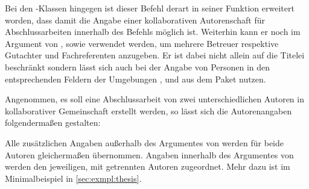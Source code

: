 \begin{DeclareEntity*}{}
\begin{DeclareEntity*}{}
\begin{DeclareEntity*}{}
\begin{Declaration}
Bei den \TUDScript-Klassen hingegen ist dieser Befehl derart in seiner Funktion 
erweitert worden, dass damit die Angabe einer kollaborativen Autorenschaft für 
Abschlussarbeiten innerhalb des Befehls  möglich ist. Weiterhin 
kann er noch im Argument von ,  sowie 
 verwendet werden, um mehrere Betreuer respektive Gutachter und 
Fachreferenten anzugeben. Er ist dabei nicht allein auf die Titelei beschränkt 
sondern lässt sich auch bei der Angabe von Personen in den entsprechenden 
Feldern der Umgebungen ,  und 
 aus dem Paket  nutzen.
\end{Declaration}
%
\begin{Example}
Angenommen, es soll eine Abschlussarbeit von zwei unterschiedlichen Autoren in 
kollaborativer Gemeinschaft erstellt werden, so lässt sich die Autorenangaben 
folgendermaßen gestalten:
\begin{Code}
\author{%
  Mickey Mouse%
\and%
  Donald Duck%
}
\end{Code}
Alle zusätzlichen Angaben außerhalb des Argumentes von  werden 
für beide Autoren gleichermaßen übernommen. Angaben innerhalb des Argumentes 
von  werden den jeweiligen, mit  getrennten Autoren 
zugeordnet. Mehr dazu ist im Minimalbeispiel in \autoref{sec:exmpl:thesis}.
\end{Example}


\end{DeclareEntity*}
\end{DeclareEntity*}
\end{DeclareEntity*}
